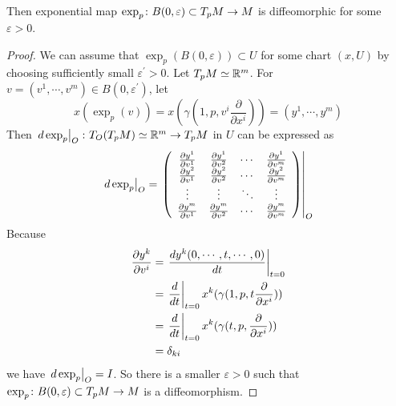\begin{thm}
	Then exponential map $\exp_p \colon B(0,\varepsilon) \subset T_pM \rightarrow M$ is diffeomorphic for some $\varepsilon > 0$.
\end{thm}
\begin{proof}
	We can assume that $\exp_p(B(0,\varepsilon)) \subset U$ for some chart $(x,U)$ by choosing sufficiently small $\varepsilon^\prime > 0$. Let $T_pM \simeq \mathbb{R}^m$. For $v = (v^1,\cdots,v^m) \in B(0,\varepsilon^\prime)$, let
	\begin{equation*}
		x(\exp_p(v)) = x(\gamma(1,p,v^i\frac{\partial}{\partial x^i})) = (y^1,\cdots,y^m)
	\end{equation*}
	Then $\left.d\exp_p\right\lvert_O \colon T_O(T_pM) \simeq \mathbb{R}^m \rightarrow T_pM$ in $U$ can be expressed as
	\begin{equation*}
		\left.d\exp_p\right\lvert_O = \left.\left(
						\begin{array}{cccc}
							\frac{\partial y^1}{\partial v^1} & \frac{\partial y^1}{\partial v^2} & \cdots &\frac{\partial y^1}{\partial v^m} \\
							\frac{\partial y^2}{\partial v^1} & \frac{\partial y^2}{\partial v^2} & \cdots &\frac{\partial y^2}{\partial v^m} \\
							\vdots & \vdots & \ddots & \vdots \\
							\frac{\partial y^m}{\partial v^1} & \frac{\partial y^m}{\partial v^2} & \cdots &\frac{\partial y^m}{\partial v^m}
						\end{array}
			\right)\right\lvert_O
	\end{equation*}
	Because
	\begin{equation*}
		\begin{aligned}
			\frac{\partial y^k}{\partial v^i} &= \left.\frac{d y^k(0,\cdots,t,\cdots,0)}{dt}\right\lvert_{t=0} \\
			&= \left.\frac{d}{dt}\right\lvert_{t=0}x^k(\gamma(1,p,t\frac{\partial}{\partial x^i})) \\
			&= \left.\frac{d}{dt}\right\lvert_{t=0}x^k(\gamma(t,p,\frac{\partial}{\partial x^i})) \\
			&= \delta_{ki}
		\end{aligned}
	\end{equation*}
	we have $\left.d\exp_p\right\lvert_O = I$. So there is a smaller $\varepsilon > 0$ such that $\exp_p \colon B(0,\varepsilon) \subset T_pM \rightarrow M$ is a diffeomorphism.
\end{proof}

